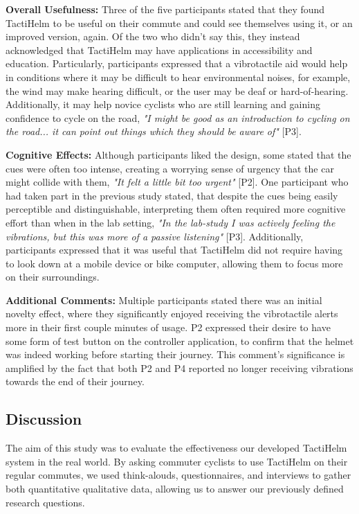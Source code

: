 \documentclass{mpaper}
\begin{document}
\textbf{Overall Usefulness:} Three of the five participants stated that they found TactiHelm to be useful on their commute and could see themselves using it, or an improved version, again. Of the two who didn't say this, they instead acknowledged that TactiHelm may have applications in accessibility and education. Particularly, participants expressed that a vibrotactile aid would help in conditions where it may be difficult to hear environmental noises, for example, the wind may make hearing difficult, or the user may be deaf or hard-of-hearing. Additionally, it may help novice cyclists who are still learning and gaining confidence to cycle on the road, \textit{"I might be good as an introduction to cycling on the road... it can point out things which they should be aware of"} [P3].

\textbf{Cognitive Effects:} Although participants liked the design, some stated that the cues were often too intense, creating a worrying sense of urgency that the car might collide with them, \textit{"It felt a little bit too urgent"} [P2]. One participant who had taken part in the previous study stated, that despite the cues being easily perceptible and distinguishable, interpreting them often required more cognitive effort than when in the lab setting, \textit{"In the lab-study I was actively feeling the vibrations, but this was more of a passive listening"} [P3]. Additionally, participants expressed that it was useful that TactiHelm did not require having to look down at a mobile device or bike computer, allowing them to focus more on their surroundings.

\textbf{Additional Comments:} Multiple participants stated there was an initial novelty effect, where they significantly enjoyed receiving the vibrotactile alerts more in their first couple minutes of usage. P2 expressed their desire to have some form of test button on the controller application, to confirm that the helmet was indeed working before starting their journey. This comment's significance is amplified by the fact that both P2 and P4 reported no longer receiving vibrations towards the end of their journey. 



\subsection{Discussion}
The aim of this study was to evaluate the effectiveness our developed TactiHelm system in the real world. By asking commuter cyclists to use TactiHelm on their regular commutes, we used think-alouds, questionnaires, and interviews to gather both quantitative qualitative data, allowing us to answer our previously defined research questions.
\end{document}
